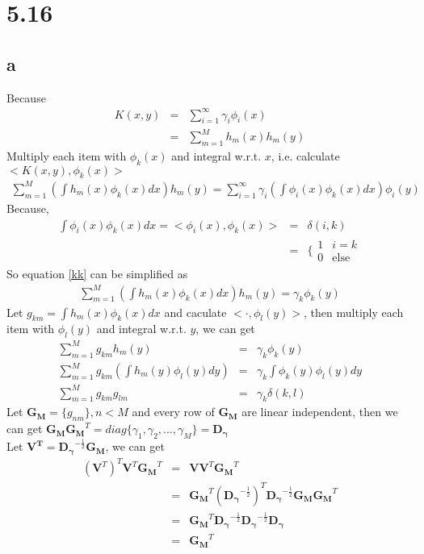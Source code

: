 \documentclass[11pt, oneside]{article}   	%
\begin{document}
\section{5.16}

\subsection{a}
Because 
\begin{eqnarray}
K(x,y) &=& \sum_{i=1}^{\infty} \gamma_i \phi_i(x)\\
&=& \sum_{m=1}^{M} h_m(x)h_m(y) 
\end{eqnarray}
Multiply each item with $\phi_k(x)$ and integral w.r.t. $x$, i.e. calculate $<K(x, y), \phi_k(x)>$
\begin{eqnarray}\label{kk}
\sum_{m=1}^{M} (\int h_m(x) \phi_k(x)dx) h_m(y) = \sum_{i=1}^{\infty} \gamma_i (\int \phi_i(x) \phi_k(x)dx)\phi_i(y)
\end{eqnarray}
Because, 
\begin{eqnarray}
\int \phi_i(x) \phi_k(x)dx = <\phi_i(x), \phi_k(x)> &=& \delta (i,k)\\
&=& \{ \begin{array}{ll}
 1 & \textrm{$i = k $}\\
 0 & \textrm{else}
  \end{array}
\end{eqnarray}
So equation \ref{kk} can be simplified as 
\begin{eqnarray}
\sum_{m=1}^{M} (\int h_m(x) \phi_k(x)dx) h_m(y) = \gamma_k \phi_k(y)
\end{eqnarray}
Let $g_{km} = \int h_m(x) \phi_k(x)dx$ and caculate $<\cdot, \phi_l(y)>$, then multiply each item with $\phi_l(y)$ and integral w.r.t. $y$, we can get 
\begin{eqnarray}
\label{gkm}
\sum_{m=1}^{M} g_{km} h_m(y) &=& \gamma_k \phi_k(y)\\
\sum_{m=1}^{M} g_{km} (\int h_m(y) \phi_l(y)dy) &=& \gamma_k \int \phi_k(y) \phi_l(y)dy\\
\sum_{m=1}^{M} g_{km} g_{lm} &=& \gamma_k  \delta (k, l)
\end{eqnarray}
Let $\mathbf{G_M} = \{g_{nm}\}, n < M $ and every row of $\mathbf{G_M}$ are linear independent, then we can get $\mathbf{G_M}\mathbf{G_M}^T = diag\{\gamma_1, \gamma_2, ... , \gamma_M\} = \mathbf{D_{\gamma}}$\\
Let $\mathbf{V^T} = \mathbf{D_{\gamma}}^{-\frac{1}{2}} \mathbf{G_M}$, we can get
\begin{eqnarray}
\label{vtv}
(\mathbf{V}^T)^T \mathbf{V}^T  \mathbf{G_M}^T &=& \mathbf{V}\mathbf{V}^T \mathbf{G_M}^T \nonumber \\
&=& \mathbf{G_M}^T (\mathbf{D_{\gamma}}^{-\frac{1}{2}})^T \mathbf{D_{\gamma}}^{-\frac{1}{2}} \mathbf{G_M} \mathbf{G_M}^T \nonumber\\
&=& \mathbf{G_M}^T \mathbf{D_{\gamma}}^{-\frac{1}{2}} \mathbf{D_{\gamma}}^{-\frac{1}{2}} \mathbf{D_{\gamma}}\nonumber\\
&=& \mathbf{G_M}^T
\end{eqnarray}
\end{document}
